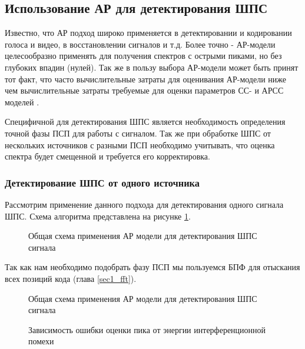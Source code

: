 \subsection{Использование АР для детектирования ШПС}
Известно, что АР подход широко применяется в детектировании и кодировании голоса и видео, в восстановлении сигналов и т.д.
Более точно - АР-модели целесообразно применять для получения спектров с острыми пиками, но без глубоких впадин (нулей).
Так же в пользу выбора АР-модели может быть принят тот факт, что часто вычислительные затраты для оценивания АР-модели 
ниже чем вычислительные затраты требуемые для оценки параметров СС- и АРСС моделей \cite{marpl_book}.

Специфичной для детектирования ШПС является необходимость определения точной фазы ПСП
для работы с сигналом. Так же при обработке ШПС от нескольких источников с разными ПСП необходимо учитывать,
что оценка спектра будет смещенной и требуется его корректировка.

\subsubsection{Детектирование ШПС от одного источника}

Рассмотрим применение данного подхода для детектирования одного сигнала ШПС. Схема алгоритма представлена на рисунке \ref{pic:lpc_basic}.
\begin{figure}[H]
	\center{}
	\caption{Общая схема применения АР модели для детектирования ШПС сигнала}
	\label{pic:lpc_basic}
\end{figure}
Так как нам необходимо подобрать фазу ПСП мы пользуемся БПФ для отыскания всех позиций кода (глава \ref{sec1_fft}).

\begin{figure}[H]
	\center{}
	\caption{Общая схема применения АР модели для детектирования ШПС сигнала}
	\label{pic:lpc_1sat}
\end{figure}

\begin{figure}[H]
	\center{}
	\caption{Зависимость ошибки оценки пика от энергии интерференционной помехи}
	\label{pic:lpc_1sat}
\end{figure}

\newpage
